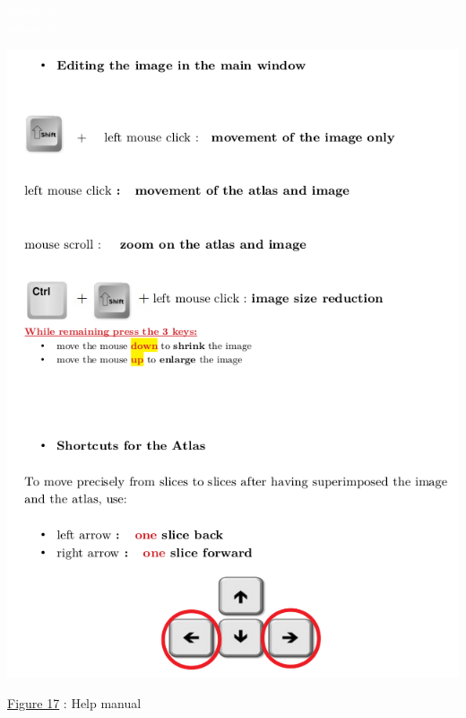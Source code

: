 \documentclass[a4paper,12pt]{report}
\begin{document}
\textcolor{white}{ouiouioui} \\
\textcolor{white}{ouiouioui} \\

\begin{center} \includegraphics[scale=0.5]{helpManuel.png}

\underline{Figure 17} : Help manual \\
\end{center}

\newpage
\end{document}
